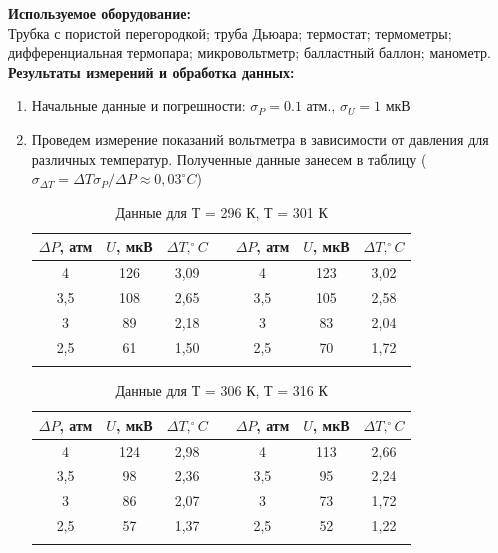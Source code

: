 \documentclass[a4paper, 12pt]{article}%
\begin{document}
	
	\textbf{Используемое оборудование: }\\
	
	Трубка с пористой перегородкой; труба Дьюара; термостат; термометры; дифференциальная термопара; микровольтметр; балластный баллон; манометр.\\
	
	
	
	\textbf{Результаты измерений и обработка данных: }\\
	
	\begin{enumerate}
		
		\item Начальные данные и погрешности: $\sigma_P = 0.1$ атм., $\sigma_U = 1$ мкВ 
	
	\item Проведем измерение показаний вольтметра в зависимости от давления для различных температур. Полученные данные занесем в таблицу ($\sigma_{\Delta T} =\Delta T \sigma_P/\Delta P \approx 0,03 ^\circ C$)
	
	\begin{longtable}{|c|c|c|c|c|c|c|}
		\hline
	$\Delta P$, атм & $U$, мкВ  & $\Delta T, ^\circ C$  &   &$\Delta P$, атм  &  $U$, мкВ   & $\Delta T, ^\circ C$  \\ \hline
		4 &  126  & 3,09 &    &  4  &  123  & 3,02  \\ \hline
		3,5 &  108  & 2,65 &    & 3,5   &  105  &  2,58 \\ \hline
		3  &  89  &  2,18 &    &  3  &  83  &  2,04 \\ \hline
		2,5 &  61  & 1,50  &    &  2,5  &  70  & 1,72 \\ \hline
		\caption{Данные для Т = 296 К, Т = 301 К}
	\end{longtable}
	
	
		\begin{longtable}{|c|c|c|c|c|c|c|}
		\hline
		$\Delta P$, атм & $U$, мкВ  & $\Delta T, ^\circ C$  &   &$\Delta P$, атм  &  $U$, мкВ   & $\Delta T, ^\circ C$  \\ \hline
		4 &  124  &  2,98 &    &  4  &  113  &  2,66 \\ \hline
		3,5 &  98  &  2,36 &    & 3,5   &  95  & 2,24  \\ \hline
		3  &  86  & 2,07 &    &  3  &  73  & 1,72 \\ \hline
		2,5 &  57  & 1,37  &    &  2,5  & 52 & 1,22 \\ \hline
		\caption{Данные для Т = 306 К, Т = 316 К}
	\end{longtable}


\end{enumerate}
\end{document}
